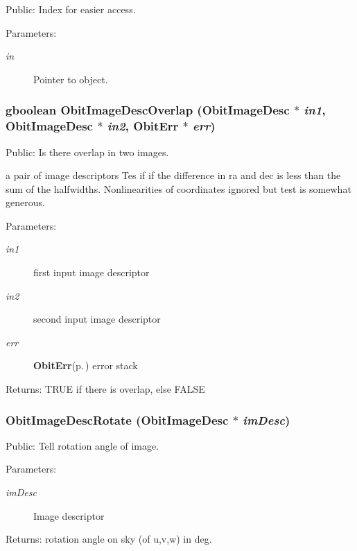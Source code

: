 Public: Index for easier access. 

\begin{Desc}
\item[Parameters:]
\begin{description}
\item[{\em in}]Pointer to object. \end{description}
\end{Desc}
\subsubsection{\setlength{\rightskip}{0pt plus 5cm}gboolean Obit\-Image\-Desc\-Overlap ({\bf Obit\-Image\-Desc} $\ast$ {\em in1}, {\bf Obit\-Image\-Desc} $\ast$ {\em in2}, {\bf Obit\-Err} $\ast$ {\em err})}\label{ObitImageDesc_8h_a20}


Public: Is there overlap in two images. 

a pair of image descriptors Tes if if the difference in ra and dec is less than the sum of the halfwidths. Nonlinearities of coordinates ignored but test is somewhat generous. \begin{Desc}
\item[Parameters:]
\begin{description}
\item[{\em in1}]first input image descriptor \item[{\em in2}]second input image descriptor \item[{\em err}]{\bf Obit\-Err}{\rm (p.\,\pageref{structObitErr})} error stack \end{description}
\end{Desc}
\begin{Desc}
\item[Returns:]TRUE if there is overlap, else FALSE \end{Desc}
\subsubsection{ Obit\-Image\-Desc\-Rotate ({\bf Obit\-Image\-Desc} $\ast$ {\em im\-Desc})}\label{ObitImageDesc_8h_a21}


Public: Tell rotation angle of image. 

\begin{Desc}
\item[Parameters:]
\begin{description}
\item[{\em im\-Desc}]Image descriptor \end{description}
\end{Desc}
\begin{Desc}
\item[Returns:]rotation angle on sky (of u,v,w) in deg. \end{Desc}
